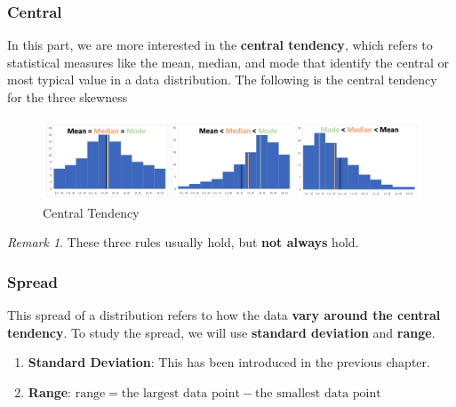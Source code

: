 \documentclass[math,code]{amznotes}
\theoremstyle{remark}
\newtheorem*{remark}{Remark}
\begin{document}
\subsubsection{Central}
In this part, we are more interested in the \textbf{central tendency}, which refers to statistical measures like the mean, median, and mode that identify the central or most typical value in a data distribution. The following is the central tendency for the three skewness
\begin{figure}[H]
    \centering
    \includegraphics[width=0.9\linewidth]{images/chapter3-central-tendancy.png}
    \caption{Central Tendency}
    \label{fig:chapter3-central-tendency}
\end{figure}
\begin{notebox}
    \begin{remark}
        These three rules usually hold, but \textbf{not always} hold.
    \end{remark}
\end{notebox}

\subsubsection{Spread}
This spread of a distribution refers to how the data \textbf{vary around the central tendency}. To study the spread, we will use \textbf{standard deviation} and \textbf{range}.
\begin{enumerate}
    \item \textbf{Standard Deviation}: This has been introduced in the previous chapter.
    \item \textbf{Range}: $\text{range}=\text{the largest data point} - \text{the smallest data point}$
\end{enumerate}
\end{document}
